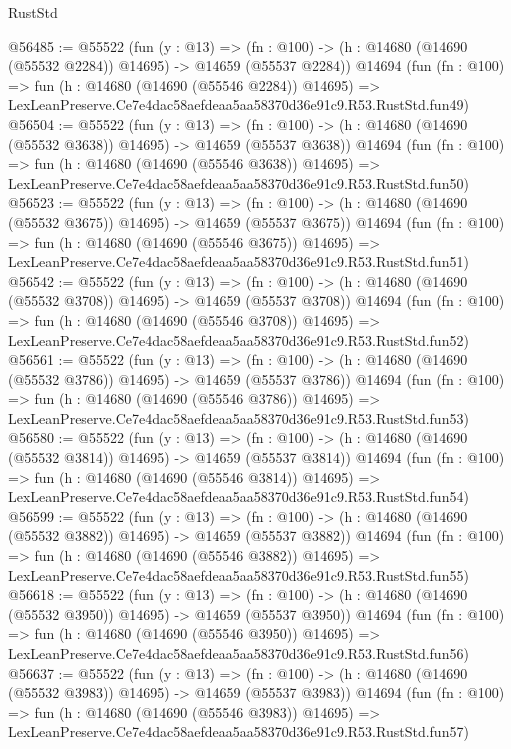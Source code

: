 \begin{lexlean}{RustStd}
\begin{coremodule}
@56485 := @55522
    (fun (y : @13) =>
    (fn : @100) -> (h : @14680 (@14690 (@55532 @2284)) @14695) -> @14659 (@55537 @2284))
    @14694
    (fun (fn : @100) =>
    fun (h : @14680 (@14690 (@55546 @2284)) @14695) =>
    LexLeanPreserve.Ce7e4dac58aefdeaa5aa58370d36e91c9.R53.RustStd.fun49)
@56504 := @55522
    (fun (y : @13) =>
    (fn : @100) -> (h : @14680 (@14690 (@55532 @3638)) @14695) -> @14659 (@55537 @3638))
    @14694
    (fun (fn : @100) =>
    fun (h : @14680 (@14690 (@55546 @3638)) @14695) =>
    LexLeanPreserve.Ce7e4dac58aefdeaa5aa58370d36e91c9.R53.RustStd.fun50)
@56523 := @55522
    (fun (y : @13) =>
    (fn : @100) -> (h : @14680 (@14690 (@55532 @3675)) @14695) -> @14659 (@55537 @3675))
    @14694
    (fun (fn : @100) =>
    fun (h : @14680 (@14690 (@55546 @3675)) @14695) =>
    LexLeanPreserve.Ce7e4dac58aefdeaa5aa58370d36e91c9.R53.RustStd.fun51)
@56542 := @55522
    (fun (y : @13) =>
    (fn : @100) -> (h : @14680 (@14690 (@55532 @3708)) @14695) -> @14659 (@55537 @3708))
    @14694
    (fun (fn : @100) =>
    fun (h : @14680 (@14690 (@55546 @3708)) @14695) =>
    LexLeanPreserve.Ce7e4dac58aefdeaa5aa58370d36e91c9.R53.RustStd.fun52)
@56561 := @55522
    (fun (y : @13) =>
    (fn : @100) -> (h : @14680 (@14690 (@55532 @3786)) @14695) -> @14659 (@55537 @3786))
    @14694
    (fun (fn : @100) =>
    fun (h : @14680 (@14690 (@55546 @3786)) @14695) =>
    LexLeanPreserve.Ce7e4dac58aefdeaa5aa58370d36e91c9.R53.RustStd.fun53)
@56580 := @55522
    (fun (y : @13) =>
    (fn : @100) -> (h : @14680 (@14690 (@55532 @3814)) @14695) -> @14659 (@55537 @3814))
    @14694
    (fun (fn : @100) =>
    fun (h : @14680 (@14690 (@55546 @3814)) @14695) =>
    LexLeanPreserve.Ce7e4dac58aefdeaa5aa58370d36e91c9.R53.RustStd.fun54)
@56599 := @55522
    (fun (y : @13) =>
    (fn : @100) -> (h : @14680 (@14690 (@55532 @3882)) @14695) -> @14659 (@55537 @3882))
    @14694
    (fun (fn : @100) =>
    fun (h : @14680 (@14690 (@55546 @3882)) @14695) =>
    LexLeanPreserve.Ce7e4dac58aefdeaa5aa58370d36e91c9.R53.RustStd.fun55)
@56618 := @55522
    (fun (y : @13) =>
    (fn : @100) -> (h : @14680 (@14690 (@55532 @3950)) @14695) -> @14659 (@55537 @3950))
    @14694
    (fun (fn : @100) =>
    fun (h : @14680 (@14690 (@55546 @3950)) @14695) =>
    LexLeanPreserve.Ce7e4dac58aefdeaa5aa58370d36e91c9.R53.RustStd.fun56)
@56637 := @55522
    (fun (y : @13) =>
    (fn : @100) -> (h : @14680 (@14690 (@55532 @3983)) @14695) -> @14659 (@55537 @3983))
    @14694
    (fun (fn : @100) =>
    fun (h : @14680 (@14690 (@55546 @3983)) @14695) =>
    LexLeanPreserve.Ce7e4dac58aefdeaa5aa58370d36e91c9.R53.RustStd.fun57)

\end{coremodule}
\end{lexlean}
